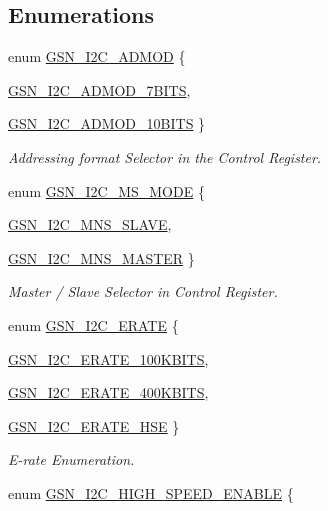 \subsection*{Enumerations}
\begin{DoxyCompactItemize}
\item 
enum \hyperlink{a00649_gab1800d5ab13710494cd9a9e6eac6e0ab}{GSN\_\-I2C\_\-ADMOD} \{ \par
\hyperlink{a00649_ggab1800d5ab13710494cd9a9e6eac6e0abadc7f88f3cdf658094fc2e850fc32fa82}{GSN\_\-I2C\_\-ADMOD\_\-7BITS}, 
\par
\hyperlink{a00649_ggab1800d5ab13710494cd9a9e6eac6e0aba20b175316fa837d475e95cf6c4d95eb4}{GSN\_\-I2C\_\-ADMOD\_\-10BITS}
 \}
\begin{DoxyCompactList}\small\item\em Addressing format Selector in the Control Register. \end{DoxyCompactList}\item 
enum \hyperlink{a00649_ga56cbec3c8496c0e235150e2779966e47}{GSN\_\-I2C\_\-MS\_\-MODE} \{ \par
\hyperlink{a00649_gga56cbec3c8496c0e235150e2779966e47a983f57036fae304e43ce78f0a82488f7}{GSN\_\-I2C\_\-MNS\_\-SLAVE}, 
\par
\hyperlink{a00649_gga56cbec3c8496c0e235150e2779966e47a52d760f8c37219014a0387df086b95fe}{GSN\_\-I2C\_\-MNS\_\-MASTER}
 \}
\begin{DoxyCompactList}\small\item\em Master / Slave Selector in Control Register. \end{DoxyCompactList}\item 
enum \hyperlink{a00649_gaa477e3e9e89468cf508ed6ea99357639}{GSN\_\-I2C\_\-ERATE} \{ \par
\hyperlink{a00649_ggaa477e3e9e89468cf508ed6ea99357639af8b3beab06731f51024cdf139f59967d}{GSN\_\-I2C\_\-ERATE\_\-100KBITS}, 
\par
\hyperlink{a00649_ggaa477e3e9e89468cf508ed6ea99357639a64cb07eb5773970cf54700c4e0d46980}{GSN\_\-I2C\_\-ERATE\_\-400KBITS}, 
\par
\hyperlink{a00649_ggaa477e3e9e89468cf508ed6ea99357639a9faa845f0bff1187e45e6a87733554d3}{GSN\_\-I2C\_\-ERATE\_\-HSE}
 \}
\begin{DoxyCompactList}\small\item\em E-\/rate Enumeration. \end{DoxyCompactList}\item 
enum \hyperlink{a00649_ga75fb1bfd3b52d6ceab35ff62418c6bf6}{GSN\_\-I2C\_\-HIGH\_\-SPEED\_\-ENABLE} \{ \par

\end{DoxyCompactItemize}
